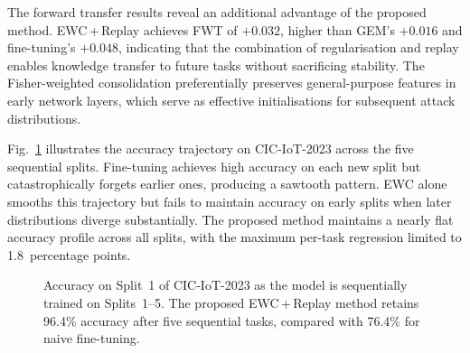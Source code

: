 \documentclass[journal]{IEEEtran}
\theoremstyle{definition}
\theoremstyle{remark}
\begin{document}
The forward transfer results reveal an additional advantage of the proposed method. EWC\,+\,Replay achieves FWT of $+0.032$, higher than GEM's $+0.016$ and fine-tuning's $+0.048$, indicating that the combination of regularisation and replay enables knowledge transfer to future tasks without sacrificing stability. The Fisher-weighted consolidation preferentially preserves general-purpose features in early network layers, which serve as effective initialisations for subsequent attack distributions.

Fig.~\ref{fig:cl_trajectory} illustrates the accuracy trajectory on CIC-IoT-2023 across the five sequential splits. Fine-tuning achieves high accuracy on each new split but catastrophically forgets earlier ones, producing a sawtooth pattern. EWC alone smooths this trajectory but fails to maintain accuracy on early splits when later distributions diverge substantially. The proposed method maintains a nearly flat accuracy profile across all splits, with the maximum per-task regression limited to 1.8~percentage points.

\begin{figure}[!t]
\centering
{}
\caption{Accuracy on Split~1 of CIC-IoT-2023 as the model is sequentially trained on Splits~1--5. The proposed EWC\,+\,Replay method retains 96.4\% accuracy after five sequential tasks, compared with 76.4\% for naive fine-tuning.}
\label{fig:cl_trajectory}
\end{figure}
\end{document}
